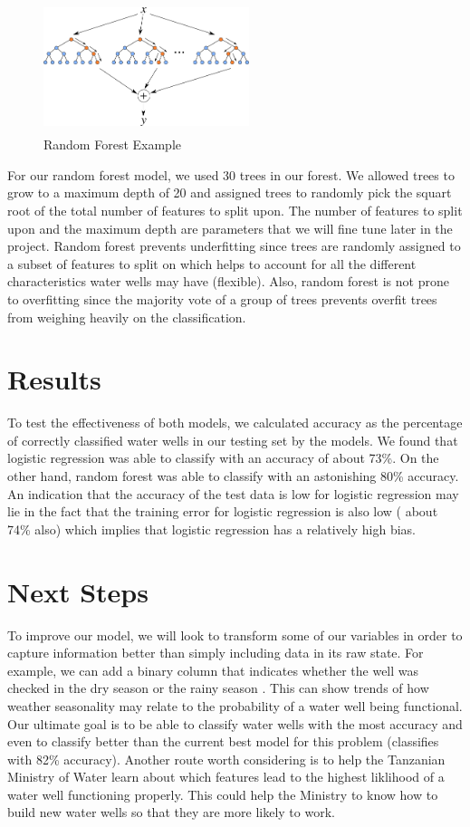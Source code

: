\documentclass[10pt]{SelfArx} %
\begin{document}
\setlength{\belowcaptionskip}{-10pt}
\begin{figure}[ht]\centering
\includegraphics[width=6cm, height=3.8cm]{rf.png}
\caption{Random Forest Example}
\label{fig:rf}
\end{figure}

For our random forest model,  we used 30 trees in our forest. We allowed trees to grow to a maximum depth of 20 and assigned trees to randomly pick the squart root of the total number of features to split upon. The number of features to split upon and the maximum depth are parameters that we will fine tune later in the project. Random forest prevents underfitting since trees are randomly assigned to a subset of features to split on which helps to account for all the different characteristics water wells may have (flexible). Also, random forest is not prone to overfitting since the majority vote of a group of trees prevents overfit trees from weighing heavily on the classification. 

\section{Results}

To test the effectiveness of both models, we calculated accuracy as the percentage of correctly classified water wells in our testing set by the models. We found that logistic regression was able to classify with an accuracy of about 73\%. On the other hand, random forest was able to classify with an astonishing 80\% accuracy. An indication that the accuracy of the test data is low for logistic regression may lie in the fact that the training error for logistic regression is also low ( about 74\% also) which implies that logistic regression has a relatively high bias.

\section{Next Steps}

To improve our model, we will look to transform some of our variables in order to capture information better than simply including data in its raw state. For example, we can add a binary column that indicates whether the well was checked in the dry season or the rainy season . This can show trends of how weather seasonality may relate to the probability of a water well being functional. Our ultimate goal is to be able to classify water wells with the most accuracy and even to classify better than the current best model for this problem (classifies with 82\% accuracy). Another route worth considering is to help the Tanzanian Ministry of Water learn about which features lead to the highest liklihood of a water well functioning properly. This could help the Ministry to know how to build new water wells so that they are more likely to work.
\end{document}
